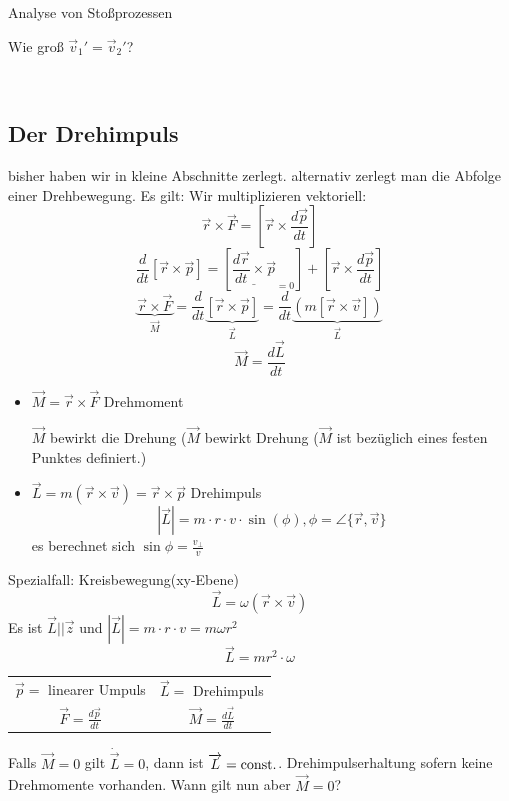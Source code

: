 \documentclass[a4paper,10pt]{scrartcl}
\begin{document}
\begin{seg}{Analyse von Stoßprozessen}
\begin{enumerate}[a]
\begin{seg}{Wie groß $\vec v_1'=\vec v_2'$?}
\end{seg}

 \end{enumerate}
\end{seg}

\\
\subsection{Der Drehimpuls}
bisher haben wir in kleine Abschnitte zerlegt.
alternativ zerlegt man die Abfolge einer Drehbewegung. Es gilt:
Wir multiplizieren vektoriell:
\[
 \vec r \times \vec F=[\vec r \times \frac{d\vec p}{dt}]
\]
\[
 \frac{d}{dt}[\vec r \times \vec p]=[\underline{\frac{d\vec r}{dt} \times \vec p}_{=0}]+[\vec r \times \frac{d\vec p}{dt}]
\]
\[
 \underbrace{\vec r\times \vec F}_{\vec M}= \frac{d}{dt}\underbrace{[\vec r \times \vec p]}_{\vec L}=\frac{d}{dt}\underbrace{(m[\vec r \times \vec v])}_{\vec L}
\]
\[
 \boxed{\vec M= \frac{d\vec L}{dt}}
\]
\begin{itemize}
 \item $\vec M=\vec r \times \vec F$ Drehmoment
\begin{ex*}
$\vec M$ bewirkt die Drehung ($\vec M$ bewirkt Drehung ($\vec M$ ist bezüglich eines festen Punktes definiert.)  
\end{ex*}
\item $\vec L=m(\vec r \times \vec v)=\vec r \times \vec p$ Drehimpuls
\[
 |\vec L|=m\cdot r \cdot v \cdot \sin(\phi), \phi= \angle \{\vec r, \vec v\}
\]
es berechnet sich $\sin \phi=\frac{v_\perp}{v}$
\end{itemize}
\begin{seg}{Spezialfall: Kreisbewegung(xy-Ebene)}
\[
 \vec L = \omega (\vec r \times \vec v)
\]
Es ist $\vec L ||\vec z$ und $|\vec L|=m\cdot r \cdot v= m\omega r^2$
\[
 \boxed{\vec L=m r^2 \cdot \omega}
\]
 \begin{table}[h]
  \begin{tabular}{c|c}
 $\vec p=$ linearer Umpuls & $\vec L=$ Drehimpuls\\ 
 $\vec F= \frac{d\vec p}{dt}$ & $\vec M=\frac{d\vec L}{dt}$
  \end{tabular}
 \end{table}
Falls $\vec M=0$ gilt $\dot{\vec L}=0$, dann ist $\overrightarrow{L}=\text{const}.$. Drehimpulserhaltung sofern keine Drehmomente vorhanden. Wann gilt nun aber $\vec M=0$?

\end{seg}
\end{document}
